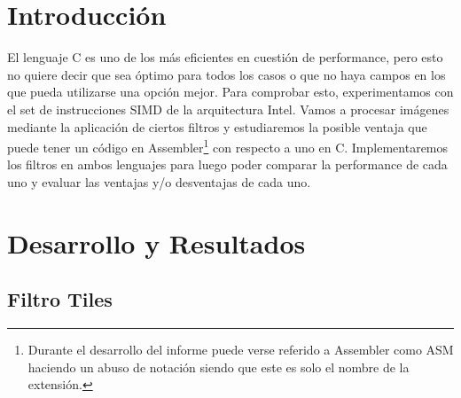 \documentclass[a4paper,10pt,twoside]{article}
\begin{document}
\newpage




\tableofcontents

\newpage




\section{Introducción}

El lenguaje C es uno de los más eficientes en cuestión de performance, pero esto no quiere decir que sea óptimo para todos los casos o que no haya campos en los que pueda utilizarse una opción mejor.
Para comprobar esto, experimentamos con el set de instrucciones SIMD de la arquitectura Intel. Vamos a procesar imágenes mediante la aplicación de ciertos filtros y estudiaremos la posible ventaja que puede tener un código en Assembler\footnote{Durante el desarrollo del informe puede verse referido a Assembler como ASM haciendo un abuso de notaci\'on siendo que este es solo el nombre de la extensi\'on.} con respecto a uno en C.
Implementaremos los filtros en ambos lenguajes para luego poder comparar la performance de cada uno y evaluar las ventajas y/o desventajas de cada uno.




\newpage
\section{Desarrollo y Resultados}

\subsection{Filtro Tiles}

%
\end{document}
